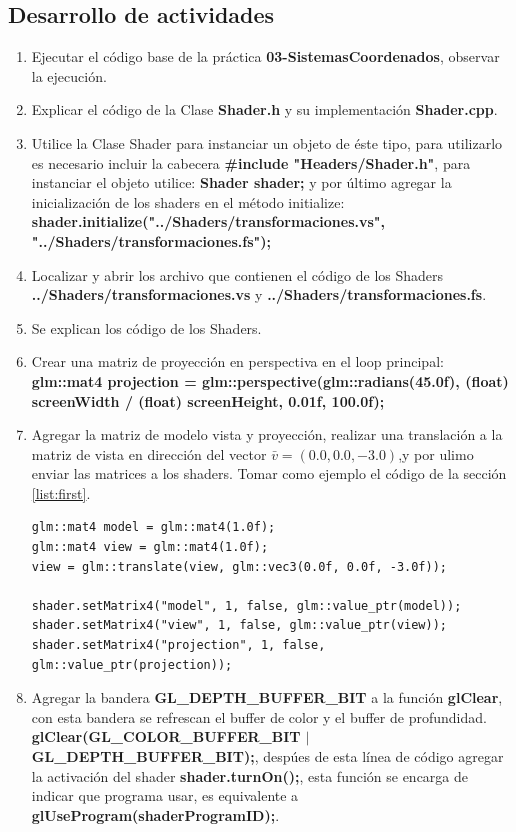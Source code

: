 \documentclass[11pt, english]{article}
\begin{document}
\subsection{Desarrollo de actividades}
\begin{enumerate}
\item Ejecutar el código base de la práctica \textbf{03-SistemasCoordenados}, observar la ejecución.
\item Explicar el código de la Clase \textbf{Shader.h} y su implementación \textbf{Shader.cpp}.
\item Utilice la Clase Shader para instanciar un objeto de éste tipo, para utilizarlo es necesario incluir  la cabecera \textbf{\#include "Headers/Shader.h"}, para instanciar el objeto utilice: \textbf{Shader shader;} y por último agregar la inicialización de los shaders en el método initialize: \textbf{shader.initialize("../Shaders/transformaciones.vs", "../Shaders/transformaciones.fs");}
\item Localizar y abrir los archivo que contienen el código de los Shaders \textbf{../Shaders/transformaciones.vs} y \textbf{../Shaders/transformaciones.fs}.
\item Se explican los código de los Shaders.
\item Crear una matriz de proyección en perspectiva en el loop principal: \\ \textbf{glm::mat4 projection = glm::perspective(glm::radians(45.0f), (float) screenWidth / (float) screenHeight, 0.01f, 100.0f);}
\item Agregar la matriz de modelo vista y proyección, realizar una translación a la matriz de vista en dirección del vector $\bar{v} = (0.0, 0.0, -3.0)$,y por ulimo enviar las matrices a los shaders. Tomar como ejemplo el código de la sección \ref{list:first}.

\begin{lstlisting}[label={list:first},caption={Ejemplo para envíar las matrices del modelo, vista y proyección.}, style=customc]
glm::mat4 model = glm::mat4(1.0f);
glm::mat4 view = glm::mat4(1.0f);
view = glm::translate(view, glm::vec3(0.0f, 0.0f, -3.0f));

shader.setMatrix4("model", 1, false, glm::value_ptr(model));
shader.setMatrix4("view", 1, false, glm::value_ptr(view));
shader.setMatrix4("projection", 1, false, glm::value_ptr(projection));
\end{lstlisting}

\item Agregar la bandera \textbf{GL\_DEPTH\_BUFFER\_BIT} a la función \textbf{glClear}, con esta bandera se refrescan el buffer de color y el buffer de profundidad.\\ \textbf{glClear(GL\_COLOR\_BUFFER\_BIT $\mid$ GL\_DEPTH\_BUFFER\_BIT);}, despúes de esta línea de código agregar la activación del shader \textbf{shader.turnOn();}, esta función se encarga de indicar que programa usar, es equivalente a \textbf{glUseProgram(shaderProgramID);}.


\end{enumerate}
\end{document}
